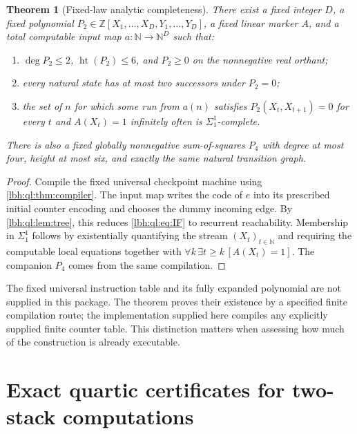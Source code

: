 \documentclass[11pt,letterpaper]{article}
\newtheorem{theorem}{Theorem}[section]
\theoremstyle{definition}
\theoremstyle{remark}
\newcommand{\N}{\mathbb N}
\newcommand{\Z}{\mathbb Z}
\DeclareMathOperator{\htp}{ht}%
\newcommand{\1}{\mathbf 1}
\begin{document}
\begin{theorem}[Fixed-law analytic completeness]\label{lbh:ql:thm:fixed}
There exist a fixed integer $D$, a fixed polynomial
$P_2\in\Z[X_1,\ldots,X_D,Y_1,\ldots,Y_D]$, a fixed linear marker $A$, and
a total computable input map $a:\N\to\N^D$ such that:
\begin{enumerate}[label=(\roman*)]
\item $\deg P_2\leq2$, $\htp(P_2)\leq6$, and $P_2\geq0$ on the
nonnegative real orthant;
\item every natural state has at most two successors under $P_2=0$;
\item the set of $n$ for which some run from $a(n)$ satisfies
$P_2(X_t,X_{t+1})=0$ for every $t$ and $A(X_t)=1$ infinitely often is
$\Sigma^1_1$-complete.
\end{enumerate}
There is also a fixed globally nonnegative sum-of-squares $P_4$ with degree
at most four, height at most six, and exactly the same natural transition graph.
\end{theorem}
\begin{proof}
Compile the fixed universal checkpoint machine using
\cref{lbh:ql:thm:compiler}. The input map writes the code of $e$ into its prescribed
initial counter encoding and chooses the dummy incoming edge. By
\cref{lbh:ql:lem:tree}, this reduces \eqref{lbh:ql:eq:IF} to recurrent reachability.
Membership in $\Sigma^1_1$ follows by existentially quantifying the stream
$(X_t)_{t\in\N}$ and requiring the computable local equations together with
$\forall k\,\exists t\geq k\,[A(X_t)=1]$. The companion $P_4$ comes from the
same compilation.
\end{proof}
The fixed universal instruction table and its fully expanded polynomial are
not supplied in this package. The theorem proves their existence by a
specified finite compilation route; the implementation supplied here compiles
any explicitly supplied finite counter table. This distinction matters when
assessing how much of the construction is already executable.
\section{Exact quartic certificates for two-stack computations}\label{lbh:sec:compiler}
\end{document}
